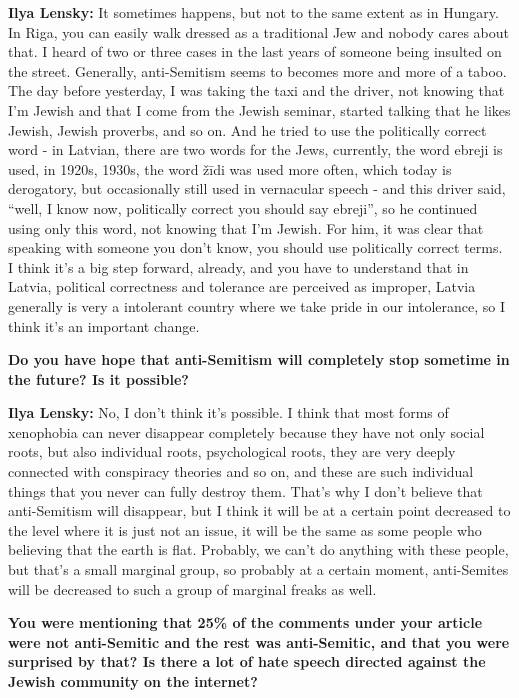 \textbf{Ilya Lensky:} It sometimes happens, but not to the same extent as in Hungary. In Riga, you can easily walk dressed as a traditional Jew and nobody cares about that. I heard of two or three cases in the last years of someone being insulted on the street. Generally, anti-Semitism seems to becomes more and more of a taboo. The day before yesterday, I was taking the taxi and the driver, not knowing that I’m Jewish and that I come from the Jewish seminar, started talking that he likes Jewish, Jewish proverbs, and so on. And he tried to use the politically correct word - in Latvian, there are two words for the Jews, currently, the word ebreji is used, in 1920s, 1930s, the word žīdi was used more often, which today is derogatory, but occasionally still used in vernacular speech - and this driver said, ``well, I know now, politically correct you should say ebreji'', so he continued using only this word, not knowing that I’m Jewish. For him, it was clear that speaking with someone you don’t know, you should use politically correct terms. I think it’s a big step forward, already, and you have to understand that in Latvia, political correctness and tolerance are perceived as improper, Latvia generally is very a intolerant country where we take pride in our intolerance, so I think it’s an important change. 

\textbf{Do you have hope that anti-Semitism will completely stop sometime in the future? Is it possible?} 

\textbf{Ilya Lensky:} No, I don’t think it’s possible. I think that most forms of xenophobia can never disappear completely because they have not only social roots, but also individual roots, psychological roots, they are very deeply connected with conspiracy theories and so on, and these are such individual things that you never can fully destroy them. That’s why I don’t believe that anti-Semitism will disappear, but I think it will be at a certain point decreased to the level where it is just not an issue, it will be the same as some people who believing that the earth is flat. Probably, we can’t do anything with these people, but that’s a small marginal group, so probably at a certain moment, anti-Semites will be decreased to such a group of marginal freaks as well. 

\textbf{You were mentioning that 25\% of the comments under your article were not anti-Semitic and the rest was anti-Semitic, and that you were surprised  by that? Is there a lot of hate speech directed against the Jewish community on the internet?} 

